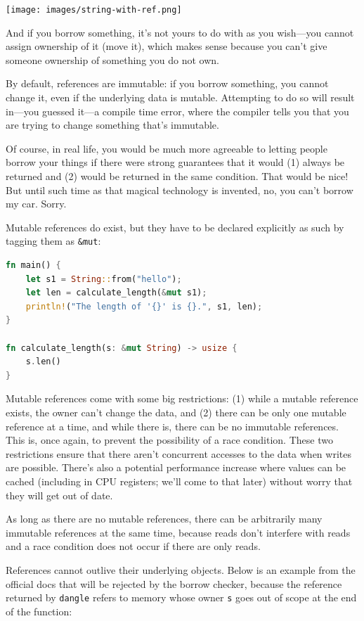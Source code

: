 \documentclass[a4paper]{report}
\begin{document}
\begin{center}
\texttt{[image: images/string-with-ref.png]}
\end{center}

And if you borrow something, it's not yours to do with as you wish---you cannot assign ownership of it (move it), which makes sense because you can't give someone ownership of something you do not own.

By default, references are immutable: if you borrow something, you cannot change it, even if the underlying data is mutable. Attempting to do so will result in---you guessed it---a compile time error, where the compiler tells you that you are trying to change something that's immutable. 

Of course, in real life, you would be much more agreeable to letting people borrow your things if there were strong guarantees that it would (1) always be returned and (2) would be returned in the same condition. That would be nice! But until such time as that magical technology is invented, no, you can't borrow my car. Sorry.

Mutable references do exist, but they have to be declared explicitly as such by tagging them as \texttt{\&mut}:

\begin{lstlisting}[language=Rust]
fn main() {
    let s1 = String::from("hello");
    let len = calculate_length(&mut s1);
    println!("The length of '{}' is {}.", s1, len);
}

fn calculate_length(s: &mut String) -> usize {
    s.len()
}
\end{lstlisting}

Mutable references come with  some big restrictions: (1) while a mutable reference exists, the owner can't change the data, and (2) there can be only one mutable reference at a time, and while there is, there can be no immutable references. This is, once again, to prevent the possibility of a race condition. These two restrictions ensure that there aren't concurrent accesses to the data when writes are possible. There's also a potential performance increase where values can be cached (including in CPU registers; we'll come to that later) without worry that they will get out of date.

As long as there are no mutable references, there can be arbitrarily many immutable references at the same time, because reads don't interfere with reads and a race condition does not occur if there are only reads. 

References cannot outlive their underlying objects. Below is an example from the official docs that will be rejected by the borrow checker, because the reference returned by \texttt{dangle} refers to memory whose owner \texttt{s} goes out of scope at the end of the function:
\end{document}
